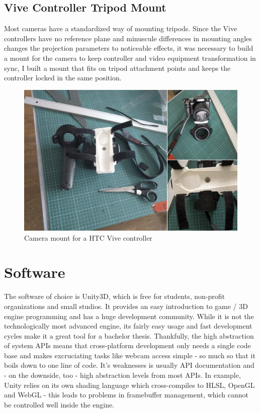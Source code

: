 \subsection{Vive Controller Tripod Mount}
Most cameras have a standardized way of mounting tripods. Since the Vive 
controllers have no reference plane and minuscule differences in mounting 
angles changes the projection parameters to noticeable effects, it was 
necessary to build a mount for the camera to keep controller and video 
equipment transformation in sync, I built a mount that fits on tripod 
attachment points and keeps the controller locked in the same position.

\begin{figure}[htb]
	\includegraphics[width=\textwidth]{_raw_resources/ViveStrap-Mount.png}
	\caption{Camera mount for a HTC Vive controller}
	\label{fig:system:camera-mount}
\end{figure}

\section{Software}

The software of choice is Unity3D, which is free for students, non-profit 
organizations and small studios. It provides an easy introduction to game / 3D 
engine programming and has a huge development community. While it is not the 
technologically most advanced engine, its fairly easy usage and fast 
development cycles make it a great tool for a bachelor thesis.
\newline
Thankfully, the high abstraction of system APIs means that cross-platform 
development only needs a single code base and makes excruciating tasks like 
webcam access simple - so much so that it boils down to one line of code.
\newline
It's weaknesses is usually API documentation and - on the downside, too - high 
abstraction levels from most APIs. In example, Unity relies on its own shading 
language which cross-compiles to HLSL, OpenGL and WebGL - this leads to 
problems in framebuffer management, which cannot be controlled well inside the 
engine.
